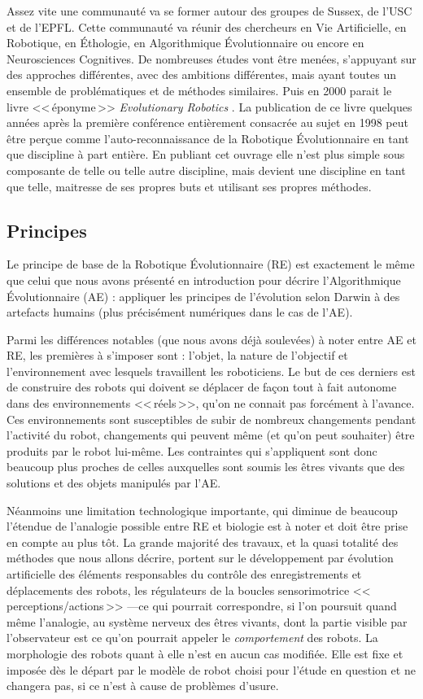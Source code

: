 Assez vite une communauté va se former autour des groupes de Sussex, de l'USC et de l'EPFL. Cette communauté va réunir des chercheurs en Vie Artificielle, en Robotique, en \'Ethologie, en Algorithmique \'Evolutionnaire ou encore en Neurosciences Cognitives. De nombreuses études vont être menées, s'appuyant sur des approches différentes, avec des ambitions différentes, mais ayant toutes un ensemble de problématiques et de méthodes similaires. Puis en 2000 parait le livre <<\,éponyme\,>> \emph{Evolutionary Robotics} \citep{nolfi00evolrobobiolintetechselfmach}. La publication de ce livre quelques années après la première conférence entièrement consacrée au sujet en 1998 peut être perçue comme l'auto-reconnaissance de la Robotique \'Evolutionnaire en tant que discipline à part entière. En publiant cet ouvrage elle n'est plus simple sous  composante de telle ou telle autre discipline, mais devient une discipline en tant que telle, maitresse de ses propres buts et utilisant ses propres méthodes.


\subsection{Principes}

Le principe de base de la Robotique \'Evolutionnaire (RE) est exactement le même que celui que nous avons présenté en introduction pour décrire l'Algorithmique \'Evolutionnaire (AE) : appliquer les principes de l'évolution selon Darwin à des artefacts humains (plus précisément numériques dans le cas de l'AE).

Parmi les différences notables (que nous avons déjà soulevées) à noter entre AE et RE, les premières à s'imposer sont : l'objet, la nature de l'objectif et l'environnement avec lesquels travaillent les roboticiens. Le but de ces derniers est de construire des robots qui doivent se déplacer de façon tout à fait autonome dans des environnements <<\,réels\,>>, qu'on ne connait pas forcément à l'avance. Ces environnements sont susceptibles de subir de nombreux changements pendant l'activité du robot, changements qui peuvent même (et qu'on peut souhaiter) être produits par le robot lui-même. Les contraintes qui s'appliquent sont donc beaucoup plus proches de celles auxquelles sont soumis les êtres vivants que des solutions et des objets manipulés par l'AE.

Néanmoins une limitation technologique importante, qui diminue de beaucoup l'étendue de l'analogie possible entre RE et biologie est à noter et doit être prise en compte au plus tôt. La grande majorité des travaux, et la quasi totalité des méthodes que nous allons décrire, portent sur le développement par évolution artificielle des éléments responsables du contrôle des enregistrements et déplacements des robots, les régulateurs de la boucles sensorimotrice <<\,perceptions/actions\,>> ---ce qui pourrait correspondre, si l'on poursuit quand même l'analogie, au système nerveux des êtres vivants, dont la partie visible par l'observateur est ce qu'on pourrait appeler le \emph{comportement} des robots. La morphologie des robots quant à elle n'est en aucun cas modifiée. Elle est fixe et imposée dès le départ par le modèle de robot choisi pour l'étude en question et ne changera pas, si ce n'est à cause de problèmes d'usure.


